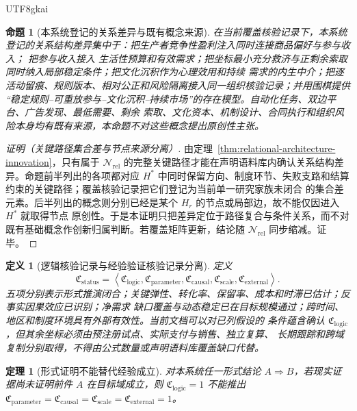 \documentclass[12pt,a4paper,openany]{report}
\newtheorem{definition}{定义}[chapter]
\newtheorem{theorem}{定理}[chapter]
\newtheorem{proposition}{命题}[chapter]
\newcommand{\Tuple}[1]{\left\langle #1\right\rangle}
\begin{document}
\begin{CJK*}{UTF8}{gkai}
\begin{proposition}[本系统登记的关系差异与既有概念来源]
\label{prop:innovation-location-boundary}
在当前覆盖核验记录下，本系统登记的关系结构差异集中于：把生产者竞争性盈利注入同时连接商品偏好与参与收入；
把参与收入接入
生活性预算和有效需求；把坐标最小充分救济与正剩余索取同时纳入局部稳定条件；把文化沉积作为心理效用和持续
需求的内生中介；把逐活动留痕、规则版本、相对公正和风险隔离接入同一组织核验记录；并用围棋提供
“稳定规则--可重放参与--文化沉积--持续市场”的存在模型。自动化任务、双边平台、广告发现、最低需要、剩余
索取、文化资本、机制设计、合同执行和组织风险本身均有既有来源，本命题不对这些概念提出原创性主张。
\end{proposition}

\begin{proof}[证明（关键路径集合差与节点来源分离）]
由定理~\ref{thm:relational-architecture-innovation}，只有属于
\(\mathcal N_{\mathrm{rel}}\) 的完整关键路径才能在声明语料库内确认关系结构差异。命题前半列出的各项都对应
\(H^*\) 中同时保留方向、制度环节、失败支路和结算约束的关键路径；覆盖核验记录把它们登记为当前单一研究家族未闭合
的集合差元素。后半列出的概念则分别已经是某个 \(H_r\) 的节点或局部边，故不能仅因进入 \(H^*\) 就取得节点
原创性。于是本证明只把差异定位于路径复合与条件关系，而不对既有基础概念作创新归属判断。若覆盖矩阵更新，结论随
\(\mathcal N_{\mathrm{rel}}\) 同步缩减。证毕。
\end{proof}

\begin{definition}[逻辑核验记录与经验验证核验记录分离]
定义
\[
  \mathfrak C_{\mathrm{status}}
  =\Tuple{
  \mathfrak C_{\mathrm{logic}},
  \mathfrak C_{\mathrm{parameter}},
  \mathfrak C_{\mathrm{causal}},
  \mathfrak C_{\mathrm{scale}},
  \mathfrak C_{\mathrm{external}}
  }.
\]
五项分别表示形式推演闭合；关键弹性、转化率、保留率、成本和时滞已估计；反事实因果效应已识别；净需求
缺口覆盖与动态稳定已在目标规模通过；跨时间、地区和制度环境具有外部有效性。当前文档可以对已列假设的
条件蕴含确认 \(\mathfrak C_{\mathrm{logic}}\)，但其余坐标必须由预注册试点、实际支付与销售、独立复算、
长期跟踪和跨域复制分别取得，不得由公式数量或声明语料库覆盖缺口代替。
\end{definition}

\begin{theorem}[形式证明不能替代经验成立]
\label{thm:formal-proof-not-empirical-validation}
对本系统任一形式结论 \(A\Rightarrow B\)，若现实证据尚未证明前件 \(A\) 在目标域成立，则
\(\mathfrak C_{\mathrm{logic}}=1\) 不能推出
\(\mathfrak C_{\mathrm{parameter}}=\mathfrak C_{\mathrm{causal}}=
  \mathfrak C_{\mathrm{scale}}=\mathfrak C_{\mathrm{external}}=1\)。
\end{theorem}


\end{CJK*}
\end{document}
